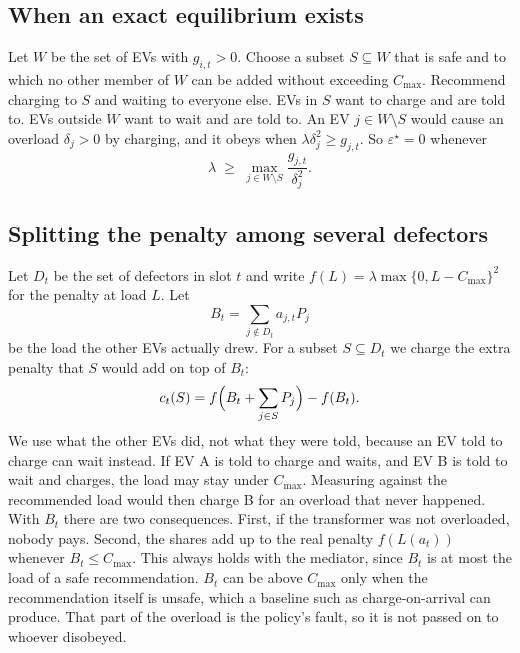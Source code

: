 \documentclass{article}
\newcommand{\cmax}{C_{\max}}
\begin{document}
\subsection{When an exact equilibrium exists}

Let $W$ be the set of EVs with $g_{i,t} > 0$. Choose a subset $S \subseteq W$ that is safe and to which no other member of $W$ can be added without exceeding $\cmax$. Recommend charging to $S$ and waiting to everyone else. EVs in $S$ want to charge and are told to. EVs outside $W$ want to wait and are told to. An EV $j \in W \setminus S$ would cause an overload $\delta_j > 0$ by charging, and it obeys when $\lambda \delta_j^2 \ge g_{j,t}$. So $\varepsilon^\star = 0$ whenever
\begin{equation}
\lambda \;\ge\; \max_{j \in W \setminus S} \frac{g_{j,t}}{\delta_j^{2}} .
\end{equation}

\subsection{Splitting the penalty among several defectors}
\label{sec:shapley}

Let $D_t$ be the set of defectors in slot $t$ and write $f(L) = \lambda \max\{0, L - \cmax\}^2$ for the penalty at load $L$. Let
\begin{equation}
B_t = \sum_{j \notin D_t} a_{j,t} P_j
\end{equation}
be the load the other EVs actually drew. For a subset $S \subseteq D_t$ we charge the extra penalty that $S$ would add on top of $B_t$:
\begin{equation}
c_t(S) = f\Bigl(B_t + \sum_{j \in S} P_j\Bigr) - f(B_t).
\label{eq:coalition}
\end{equation}
We use what the other EVs did, not what they were told, because an EV told to charge can wait instead. If EV A is told to charge and waits, and EV B is told to wait and charges, the load may stay under $\cmax$. Measuring against the recommended load would then charge B for an overload that never happened. With $B_t$ there are two consequences. First, if the transformer was not overloaded, nobody pays. Second, the shares add up to the real penalty $f(L(a_t))$ whenever $B_t \le \cmax$. This always holds with the mediator, since $B_t$ is at most the load of a safe recommendation. $B_t$ can be above $\cmax$ only when the recommendation itself is unsafe, which a baseline such as charge-on-arrival can produce. That part of the overload is the policy's fault, so it is not passed on to whoever disobeyed.
\end{document}
